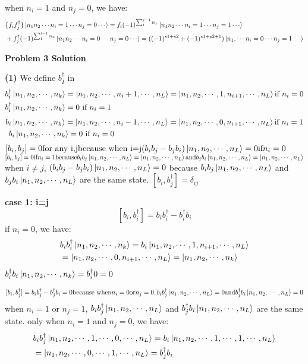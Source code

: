 \documentclass[12pt]{article}
\begin{document}
when $n_i=1$ and $n_j=0$, we have:
\[
\begin{aligned}
    &\{f_i f_j^\dagger\} \ket{n_1 n_2 \cdots n_i=1 \cdots n_j=0 \cdots} = f_i (-1)^{\sum_{1}^{j-1}n_x} \ket{n_1 n_2 \cdots n_i=1 \cdots n_j=1 \cdots} \\
    &+ f_j^\dagger (-1)^{\sum_{1}^{i-1}n_x} \ket{n_1 n_2 \cdots n_i=0 \cdots n_j=0 \cdots}=((-1)^{s1+s2}+(-1)^{s1+s2+1})\ket{n_1,\cdots n_i=0 \cdots n_j=1 \cdots} \\
\end{aligned}
\]
\begin{center}
    \textbf{Problem 3 Solution}
\end{center}

\textbf{(1)}
We define $b_I^\dagger$ in 
\[
\begin{aligned}
&b_i^\dagger\ket{n_1,n_2,\cdots,n_k}=\ket{n_1,n_2,\cdots,n_i+1,\cdots,n_L}=\ket{n_1,n_2,\cdots,1,n_{i+1},\cdots,n_L}\text{if }n_i=0 \\
&b_i^\dagger\ket{n_1,n_2,\cdots,n_k}=0\text{  if }n_i=1 \\
\end{aligned}
\]
\[
\begin{aligned}
b&_i\ket{n_1,n_2,\cdots,n_k}=\ket{n_1,n_2,\cdots,n_i-1,\cdots,n_L}=\ket{n_1,n_2,\cdots,0,n_{i+1},\cdots,n_L}\text{if }n_i=1 \\
&b_i\ket{n_1,n_2,\cdots,n_k}=0\text{  if }n_i=0 \\   
\end{aligned}
\]
$[b_i,b_j]=0 \text{for any i,j} \text{because when i=j} (b_ib_j-b_jb_i)\ket{n_1,n_2,\cdots,n_L}=0\text{if}n_i=0$
$[b_i,b_j]=0\text{if}n_i=1\text{because}b_ib_j\ket{n_1,n_2,\cdots,n_L}=\ket{n_1,n_2,\cdots,n_L} \text{and}b_jb_i\ket{n_1,n_2,\cdots,n_L}=\ket{n_1,n_2,\cdots,n_L}$
when $i\neq j$, $(b_ib_j-b_jb_i)\ket{n_1,n_2,\cdots,n_L}=0$ because $b_ib_j\ket{n_1,n_2,\cdots,n_L}$ and $b_jb_i\ket{n_1,n_2,\cdots,n_L}$ are the same state.
$[b_i,b_j^\dagger]=\delta_{ij}$

\textbf{case 1: i=j}
\[[b_i,b_i^\dagger]=b_ib_i^\dagger-b_i^\dagger b_i\]
if $n_i=0$, we have:
\[\begin{aligned}
&b_ib_i^\dagger\ket{n_1,n_2,\cdots,n_k} = b_i\ket{n_1,n_2,\cdots,1,n_{i+1},\cdots,n_L} \\
&=\ket{n_1,n_2,\cdots,0,n_{i+1},\cdots,n_L}=\ket{n_1,n_2,\cdots,n_k} \\
\end{aligned}
\]
$b_i^\dagger b_i\ket{n_1,n_2,\cdots,n_k}=b_i^\dagger 0=0$

\[[b_i,b_j^\dagger]=b_ib_j^\dagger-b_j^\dagger b_i
=0\text{because when}n_i=0\text{or}n_j=0,b_ib_j^\dagger\ket{n_1,n_2,\cdots,n_L}=0\text{and}b_j^\dagger b_i\ket{n_1,n_2,\cdots,n_L}=0\]
when $n_i=1$ or $n_j=1$, $b_ib_j^\dagger\ket{n_1,n_2,\cdots,n_L}$ and $b_j^\dagger b_i\ket{n_1,n_2,\cdots,n_L}$ are the same state.
only when $n_i=1$ and $n_j=0$, we have:
\[
\begin{aligned}
&b_ib_j^\dagger\ket{n_1,n_2,\cdots,1,\cdots,0,\cdots,n_L} = b_i\ket{n_1,n_2,\cdots,1,\cdots,1,\cdots,n_L} \\
&=\ket{n_1,n_2,\cdots,0,\cdots,1,\cdots,n_L}=b_j^\dagger b_i \\
\end{aligned}
\]
\end{document}
